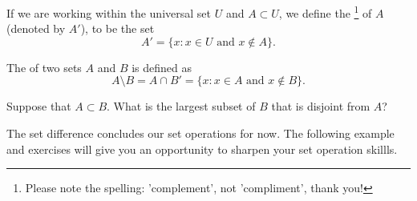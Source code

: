 If we are working within the universal set $U$ and $A \subset U$, we define the \footnote{Please note the spelling: 'complement', not 'compliment', thank you!} of $A$ (denoted by $A'$), to be the set
\[
A' = \{ x : x \in U \text{ and } x \notin A \}.
\]


\begin{defn}\label{setdifference}
The  of two sets $A$ and $B$ is defined as
\[
A \setminus B = A \cap B'  = \{ x : x \in A \text{ and } x \notin B \}.
\]
\end{defn}

\begin{exercise}\label{exercise:sets:18}
Suppose that $A \subset B$. What is the largest subset of $B$ that is disjoint from $A$?
\end{exercise}

\noindent
The set difference concludes our set operations for now.  The following example and exercises will give you an opportunity to sharpen your set operation skillls. 
 
